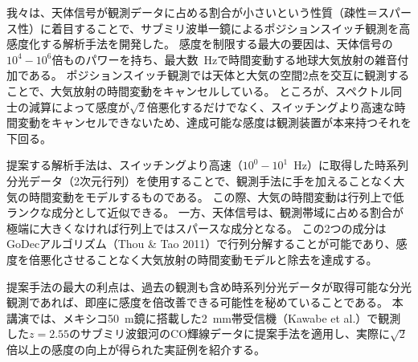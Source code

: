 \documentclass[ja]{2020b}
\begin{document}

我々は、天体信号が観測データに占める割合が小さいという性質（疎性＝スパース性）に着目することで、サブミリ波単一鏡によるポジションスイッチ観測を高感度化する解析手法を開発した。
感度を制限する最大の要因は、天体信号の$10^{4}-10^{6}$倍ものパワーを持ち、最大数~Hzで時間変動する地球大気放射の雑音付加である。
ポジションスイッチ観測では天体と大気の空間2点を交互に観測することで、大気放射の時間変動をキャンセルしている。
ところが、スペクトル同士の減算によって感度が$\sqrt{2}$倍悪化するだけでなく、スイッチングより高速な時間変動をキャンセルできないため、達成可能な感度は観測装置が本来持つそれを下回る。

提案する解析手法は、スイッチングより高速（$10^{0}-10^{1}$~Hz）に取得した時系列分光データ（2次元行列）を使用することで、観測手法に手を加えることなく大気の時間変動をモデルするものである。
この際、大気の時間変動は行列上で低ランクな成分として近似できる。
一方、天体信号は、観測帯域に占める割合が極端に大きくなければ行列上ではスパースな成分となる。
この2つの成分はGoDecアルゴリズム（Thou \& Tao 2011）で行列分解することが可能であり、感度を倍悪化させることなく大気放射の時間変動モデルと除去を達成する。

提案手法の最大の利点は、過去の観測も含め時系列分光データが取得可能な分光観測であれば、即座に感度を倍改善できる可能性を秘めていることである。
本講演では、メキシコ50~m鏡に搭載した2~mm帯受信機（Kawabe et al.）で観測した$z=2.55$のサブミリ波銀河のCO輝線データに提案手法を適用し、実際に$\sqrt{2}$倍以上の感度の向上が得られた実証例を紹介する。



\end{document}
